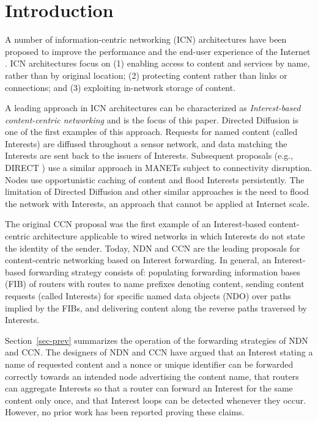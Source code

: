 \documentclass{ancs15-alternate}
\begin{document}
\section{Introduction}

A number of  information-centric networking (ICN) architectures have been proposed to improve the performance and the end-user experience of the Internet \cite{icn-survey1,  icn-survey2}. ICN architectures focus on (1) enabling access to content and services by name, rather than by original location; (2) protecting content rather than links or connections; and (3) exploiting in-network storage of content. 

A leading approach in ICN architectures can be characterized as {\em Interest-based content-centric networking} and is the focus of this paper.
Directed Diffusion \cite{diffusion} is one of the first examples of this approach.  Requests for named content (called Interests) are diffused throughout a sensor network, and data matching the Interests are sent back to the issuers of Interests. Subsequent proposals (e.g., 
DIRECT \cite{direct})   use a similar approach in MANETs subject to  connectivity disruption. Nodes  use opportunistic caching of content and  flood Interests persistently.  The limitation of Directed Diffusion and other similar  approaches is the need to flood the network with Interests, an approach that cannot be applied at Internet scale.

The original CCN proposal \cite{ccn} was the first example of an Interest-based content-centric  architecture applicable to wired networks in which Interests do not state the identity of the sender. Today, NDN \cite{ndn} and CCN \cite{ccnx} are the leading proposals for  content-centric networking based on Interest forwarding.
In general,  an Interest-based forwarding strategy consists of: populating forwarding information bases (FIB) of routers with routes to name prefixes denoting content, sending content requests (called Interests) for specific named data objects (NDO) over paths implied by the FIBs, and delivering content along the reverse paths traversed by Interests.  

Section~\ref{sec-prev} summarizes  the operation of the  forwarding strategies of  NDN and CCN. The designers of NDN and CCN have argued \cite{ccn, ndn, ndn-fw, ndn-fw2} that an Interest 
stating a name of requested content and a nonce or unique identifier can be forwarded correctly towards an intended node advertising the content name, that routers can aggregate Interests so that a router can forward an Interest for the same content only once, and that
Interest loops can be detected whenever they occur.  However,  no prior work has been reported proving these claims.
\end{document}
